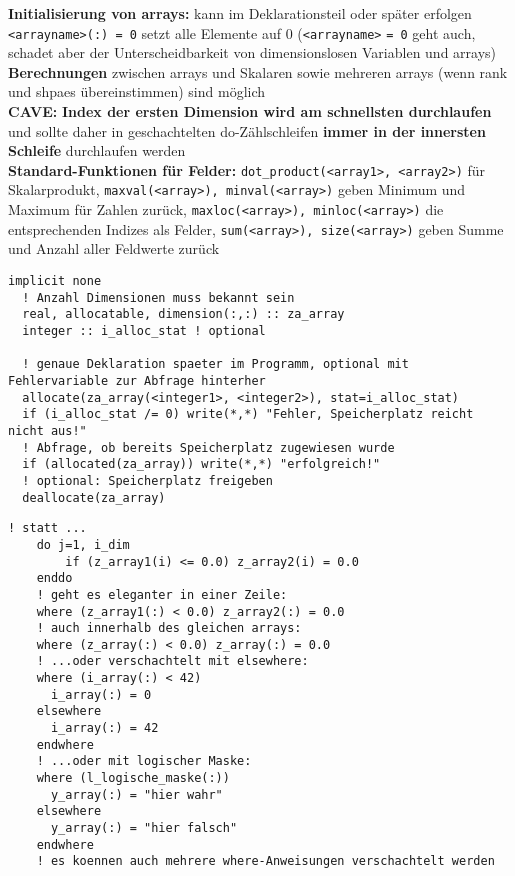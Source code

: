 \documentclass[a4paper, twocolumn]{scrarticle}
\begin{document}
\textbf{Initialisierung von arrays:} kann im Deklarationsteil oder später erfolgen \lstinline|<arrayname>(:) = 0| setzt alle Elemente auf 0 (\lstinline|<arrayname>| \lstinline|= 0| geht auch, schadet aber der Unterscheidbarkeit von dimensionslosen Variablen und arrays)\\
\textbf{Berechnungen} zwischen arrays und Skalaren sowie mehreren arrays (wenn rank und shpaes übereinstimmen) sind möglich\\
\textbf{CAVE:} \textbf{Index der ersten Dimension wird am schnellsten durchlaufen} und sollte daher in geschachtelten do-Zählschleifen \textbf{immer in der innersten Schleife} durchlaufen werden\\
\textbf{Standard-Funktionen für Felder:} \lstinline|dot_product(<array1>, <array2>)| für Skalarprodukt, \lstinline|maxval(<array>), minval(<array>)| geben Minimum und Maximum für Zahlen zurück, \lstinline|maxloc(<array>), minloc(<array>)| die entsprechenden Indizes als Felder, \lstinline|sum(<array>), size(<array>)| geben Summe und Anzahl aller Feldwerte zurück
\begin{lstlisting}[caption={\bfseries Allocatable Arrays (shape erst im Programmverlauf)}]
  implicit none
  ! Anzahl Dimensionen muss bekannt sein
  real, allocatable, dimension(:,:) :: za_array
  integer :: i_alloc_stat ! optional
  
  ! genaue Deklaration spaeter im Programm, optional mit Fehlervariable zur Abfrage hinterher
  allocate(za_array(<integer1>, <integer2>), stat=i_alloc_stat)
  if (i_alloc_stat /= 0) write(*,*) "Fehler, Speicherplatz reicht nicht aus!"
  ! Abfrage, ob bereits Speicherplatz zugewiesen wurde
  if (allocated(za_array)) write(*,*) "erfolgreich!"
  ! optional: Speicherplatz freigeben
  deallocate(za_array)
\end{lstlisting}
\begin{lstlisting}[caption={\bfseries where-Statement als Ersatz für do-if in Feldern},language=Fortran95Konkret]
	! statt ...
	do j=1, i_dim
		if (z_array1(i) <= 0.0) z_array2(i) = 0.0
	enddo
	! geht es eleganter in einer Zeile:
	where (z_array1(:) < 0.0) z_array2(:) = 0.0
	! auch innerhalb des gleichen arrays:
	where (z_array(:) < 0.0) z_array(:) = 0.0
	! ...oder verschachtelt mit elsewhere:
	where (i_array(:) < 42)
	  i_array(:) = 0
	elsewhere
	  i_array(:) = 42
	endwhere
	! ...oder mit logischer Maske:
	where (l_logische_maske(:))
	  y_array(:) = "hier wahr"
	elsewhere
	  y_array(:) = "hier falsch"
	endwhere
	! es koennen auch mehrere where-Anweisungen verschachtelt werden
\end{lstlisting}
\end{document}

